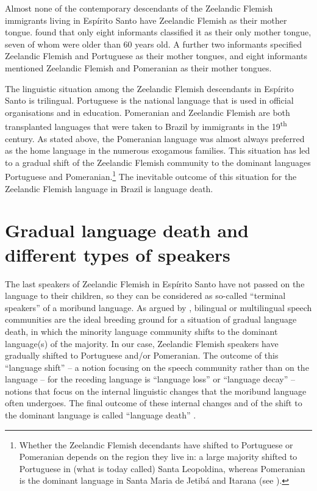 \documentclass[output=paper,hidelinks,draftmode]{langscibook}
\begin{document}
Almost none of the contemporary descendants of the Zeelandic Flemish immigrants living in Espírito Santo have Zeelandic Flemish as their mother tongue. \citet[77]{Schaffel2010} found that only eight informants classified it as their only mother tongue, seven of whom were older than 60 years old. A further two informants specified Zeelandic Flemish and Portuguese as their mother tongues, and eight informants mentioned Zeelandic Flemish and Pomeranian as their mother tongues. 

The linguistic situation among the Zeelandic Flemish descendants in Espírito Santo is trilingual. Portuguese is the national language that is used in official organisations and in education. Pomeranian and Zeelandic Flemish are both transplanted languages that were taken to Brazil by immigrants in the 19\textsuperscript{th} century. As stated above, the Pomeranian language was almost always preferred as the home language in the numerous exogamous families. This situation has led to a gradual shift of the Zeelandic Flemish community to the dominant languages Portuguese and Pomeranian.\footnote{Whether the Zeelandic Flemish decendants have shifted to Portuguese or Pomeranian depends on the region they live in: a large majority shifted to Portuguese in (what is today called) Santa Leopoldina, whereas Pomeranian is the dominant language in Santa Maria de Jetibá and Itarana (see \citealt{Schaffel2010, SchaffelBremenkampPostma2017}).} The inevitable outcome of this situation for the Zeelandic Flemish language in Brazil is language death.

\section{Gradual language death and different types of speakers}
\label{sec:schaffel:2}
The last speakers of Zeelandic Flemish in Espírito Santo have not passed on the language to their children, so they can be considered as so-called ``terminal speakers'' \citep{Sasse1992} of a moribund language. As argued by \citet[195]{Dressler1996}, bilingual or multilingual speech communities are the ideal breeding ground for a situation of gradual language death, in which the minority language community shifts to the dominant language(s) of the majority. In our case, Zeelandic Flemish speakers have gradually shifted to Portuguese and/or Pomeranian. The outcome of this ``language shift'' – a notion focusing on the speech community rather than on the language \citep[5]{Rottet1995} – for the receding language is ``language loss'' \citep{AppelMuysken1987, FaseKroon1992} or ``language decay'' \citep{Field1985, Sasse1991} – notions that focus on the internal linguistic changes that the moribund language often undergoes. The final outcome of these internal changes and of the shift to the dominant language is called ``language death'' \citep{Dressler1972, Dorian1977}.
\end{document}
